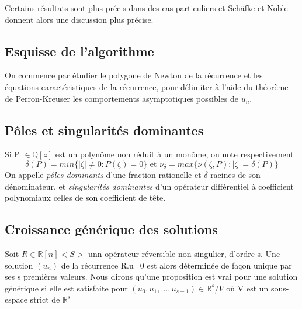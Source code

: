 \documentclass[a4paper,10.5pt]{article}
\begin{document}
	Certains résultats sont plus précis dans des cas particuliers et Schäfke et Noble donnent alors une discussion plus précise.
	
	\subsection{Esquisse de l'algorithme}
	
	On commence par étudier le polygone de Newton de la récurrence et les équations caractéristiques de la récurrence, pour délimiter à l'aide du théorème de Perron-Kreuser les comportements asymptotiques possibles de $u_{n}$.
	
	\subsection{Pôles et singularités dominantes}
	
	\begin{definition} Si P $\in \mathbb{Q}[z]$ est un polynôme non réduit à un monôme, on note respectivement
		\[\delta(P)=min\{|\zeta| \neq 0: P(\zeta)=0\} \text{ et } \nu_{\delta}=max\{\nu(\zeta,P):|\zeta|=\delta(P)\}\] 
		On appelle \textit{pôles dominants} d'une fraction rationelle et $\delta$-racines  de son dénominateur, et \textit{singularités dominantes} d'un opérateur différentiel à coefficient polynomiaux celles de son coefficient de tête.  
	\end{definition}
	
	\subsection{Croissance générique des solutions}
	
	\begin{definition} Soit $R \in \mathbb{R}[n]\big< S\big>$ unn opérateur réversible non singulier, d'ordre s. Une solution $(u_{n})$ de la récurrence R.u=0 est alors déterminée de façon unique par ses s premières valeurs. Nous dirons qu'une proposition est vrai pour une solution générique si elle est satisfaite pour $(u_{0},u_{1},...,u_{s-1}) \in \mathbb{R}^{s}/V$ où V est un sous-espace strict de $\mathbb{R}^{s}$
		
	\end{definition}
	
\end{document}
